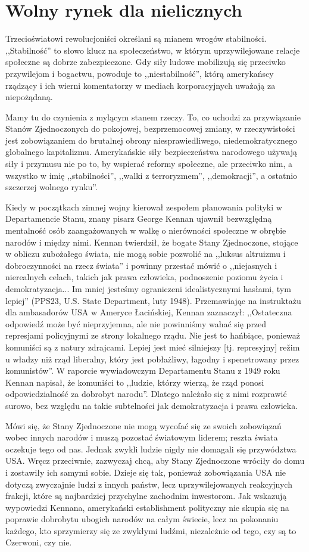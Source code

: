 \documentclass[12pt]{book}
\newcommand{\sekcja}[1]{
  \addcontentsline{toc}{section}{#1}
  \section*{#1}
}
\begin{document}
\sekcja{Wolny rynek dla nielicznych}
Trzecioświatowi rewolucjoniści określani są mianem wrogów stabilności. ,,Stabilność'' to słowo klucz na społeczeństwo, w którym uprzywilejowane relacje społeczne są dobrze zabezpieczone. Gdy siły ludowe mobilizują się przeciwko przywilejom i bogactwu, powoduje to ,,niestabilność'', którą amerykańscy rządzący i ich wierni komentatorzy w mediach korporacyjnych uważają za niepożądaną.

Mamy tu do czynienia z mylącym stanem rzeczy. To, co uchodzi za przywiązanie Stanów Zjednoczonych do pokojowej, bezprzemocowej zmiany, w rzeczywistości jest zobowiązaniem do brutalnej obrony niesprawiedliwego, niedemokratycznego globalnego kapitalizmu. Amerykańskie siły bezpieczeństwa narodowego używają siły i przymusu nie po to, by wspierać reformy społeczne, ale przeciwko nim, a wszystko w imię ,,stabilności'', ,,walki z terroryzmem'', ,,demokracji'', a ostatnio szczerzej wolnego rynku''.

Kiedy w początkach zimnej wojny kierował zespołem planowania polityki w Departamencie Stanu, znany pisarz George Kennan ujawnił bezwzględną mentalność osób zaangażowanych w walkę o nierówności społeczne w obrębie narodów i między nimi. Kennan twierdził, że bogate Stany Zjednoczone, stojące w obliczu zubożałego świata, nie mogą sobie pozwolić na ,,luksus altruizmu i dobroczynności na rzecz świata'' i powinny przestać mówić o ,,niejasnych i nierealnych celach, takich jak prawa człowieka, podnoszenie poziomu życia i demokratyzacja... Im mniej jesteśmy ograniczeni idealistycznymi hasłami, tym lepiej'' (PPS23, U.S. State Department, luty 1948). Przemawiając na instruktażu dla ambasadorów USA w Ameryce Łacińskiej, Kennan zaznaczył: ,,Ostateczna odpowiedź może być nieprzyjemna, ale nie powinniśmy wahać się przed represjami policyjnymi ze strony lokalnego rządu. Nie jest to hańbiące, ponieważ komuniści są z natury zdrajcami. Lepiej jest mieć silniejszy [tj. represyjny] režim u władzy niż rząd liberalny, który jest pobłażliwy, łagodny i spenetrowany przez komunistów''. W raporcie wywiadowczym Departamentu Stanu z 1949 roku Kennan napisał, że komuniści to ,,ludzie, którzy wierzą, że rząd ponosi odpowiedzialność za dobrobyt narodu''. Dlatego należało się z nimi rozprawić surowo, bez względu na takie subtelności jak demokratyzacja i prawa człowieka.

Mówi się, że Stany Zjednoczone nie mogą wycofać się ze swoich zobowiązań wobec innych narodów i muszą pozostać światowym liderem; reszta świata oczekuje tego od nas. Jednak zwykli ludzie nigdy nie domagali się przywództwa USA. Wręcz przeciwnie, zazwyczaj chcą, aby Stany Zjednoczone wróciły do domu i zostawiły ich samymi sobie. Dzieje się tak, ponieważ zobowiązania USA nie dotyczą zwyczajnie ludzi z innych państw, lecz uprzywilejowanych reakcyjnych frakcji, które są najbardziej przychylne zachodnim inwestorom. Jak wskazują wypowiedzi Kennana, amerykański establishment polityczny nie skupia się na poprawie dobrobytu ubogich narodów na całym świecie, lecz na pokonaniu każdego, kto sprzymierzy się ze zwykłymi ludźmi, niezależnie od tego, czy są to Czerwoni, czy nie.
\end{document}
